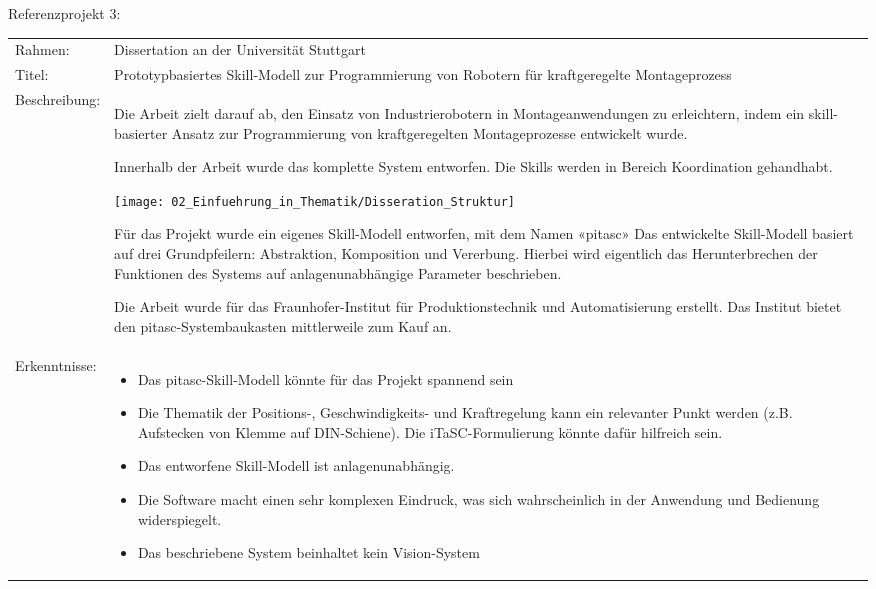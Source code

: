 	\newpage
	
	Referenzprojekt 3:
	\vspace{2mm}
	\\
	\begin{tabularx}{\textwidth}{@{}>{}p{8em} X@{}}
		Rahmen: & 
		Dissertation an der Universität Stuttgart 
		\\
		
		Titel: & 
		Prototypbasiertes Skill-Modell zur Programmierung von Robotern für kraftgeregelte Montageprozess
		\\
		
		Beschreibung: & 
		Die Arbeit zielt darauf ab, den Einsatz von Industrierobotern in Montageanwendungen zu erleichtern, indem ein skill-basierter Ansatz zur Programmierung von kraftgeregelten Montageprozesse entwickelt wurde. 
		
		Innerhalb der Arbeit wurde das komplette System entworfen. Die Skills werden in Bereich Koordination gehandhabt.  
		
		\texttt{[image: 02\_Einfuehrung\_in\_Thematik/Disseration\_Struktur]}
		
		Für das Projekt wurde ein eigenes Skill-Modell entworfen, mit dem Namen «pitasc»
		Das entwickelte Skill-Modell basiert auf drei Grundpfeilern: Abstraktion, Komposition und Vererbung. Hierbei wird eigentlich das Herunterbrechen der Funktionen des Systems auf anlagenunabhängige Parameter beschrieben. 
		
		Die Arbeit wurde für das Fraunhofer-Institut für Produktionstechnik und Automatisierung erstellt. Das Institut bietet den pitasc-Systembaukasten mittlerweile zum Kauf an. 
		\\
		
		Erkenntnisse: & 
		\begin{itemize}
			\item Das pitasc-Skill-Modell könnte für das Projekt spannend sein
			\item Die Thematik der Positions-, Geschwindigkeits- und Kraftregelung kann ein relevanter Punkt werden (z.B. Aufstecken von Klemme auf DIN-Schiene). Die iTaSC-Formulierung könnte dafür hilfreich sein. 
			\item Das entworfene Skill-Modell ist anlagenunabhängig. 
			\item Die Software macht einen sehr komplexen Eindruck, was sich wahrscheinlich in der Anwendung und Bedienung widerspiegelt.
			\item Das beschriebene System beinhaltet kein Vision-System
		\end{itemize}
	\end{tabularx}
	
